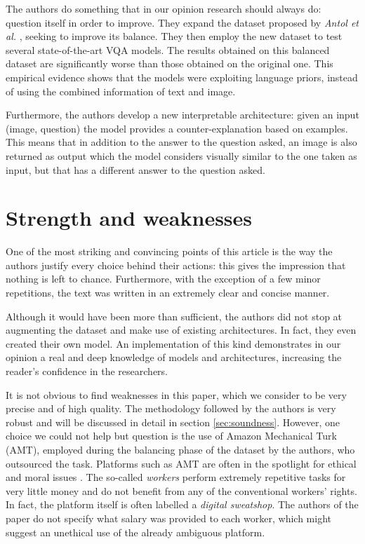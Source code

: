 \documentclass[letterpaper,11pt]{article}
\begin{document}
The authors do something that in our opinion research should always do: question itself in order to improve. They expand the dataset proposed by \textit{Antol et al.} \cite{antol2015vqa}, seeking to improve its balance. They then employ the new dataset to test several state-of-the-art VQA models. The results obtained on this balanced dataset are significantly worse than those obtained on the original one. This empirical evidence shows that the models were exploiting language priors, instead of using the combined information of text and image. 

Furthermore, the authors develop a new interpretable architecture: given an input (image, question) the model provides a counter-explanation based on examples. This means that in addition to the answer to the question asked, an image is also returned as output which the model considers visually similar to the one taken as input, but that has a different answer to the question asked.


\section{Strength and weaknesses}
\label{sec:procons}

One of the most striking and convincing points of this article is the way the authors justify every choice behind their actions: this gives the impression that nothing is left to chance. Furthermore, with the exception of a few minor repetitions, the text was written in an extremely clear and concise manner.

Although it would have been more than sufficient, the authors did not stop at augmenting the dataset and make use of existing architectures. In fact, they even created their own model. An implementation of this kind demonstrates in our opinion a real and deep knowledge of models and architectures, increasing the reader's confidence in the researchers.

It is not obvious to find weaknesses in this paper, which we consider to be very precise and of high quality. The methodology followed by the authors is very robust and will be discussed in detail in section \ref{sec:soundness}. However, one choice we could not help but question is the use of Amazon Mechanical Turk (AMT), employed during the balancing phase of the dataset by the authors, who outsourced the task. Platforms such as AMT are often in the spotlight for ethical and moral issues \cite{fort2011amazon}. The so-called \textit{workers} perform extremely repetitive tasks for very little money and do not benefit from any of the conventional workers' rights. In fact, the platform itself is often labelled a \textit{digital sweatshop}. The authors of the paper do not specify what salary was provided to each worker, which might suggest an unethical use of the already ambiguous platform.
\end{document}
